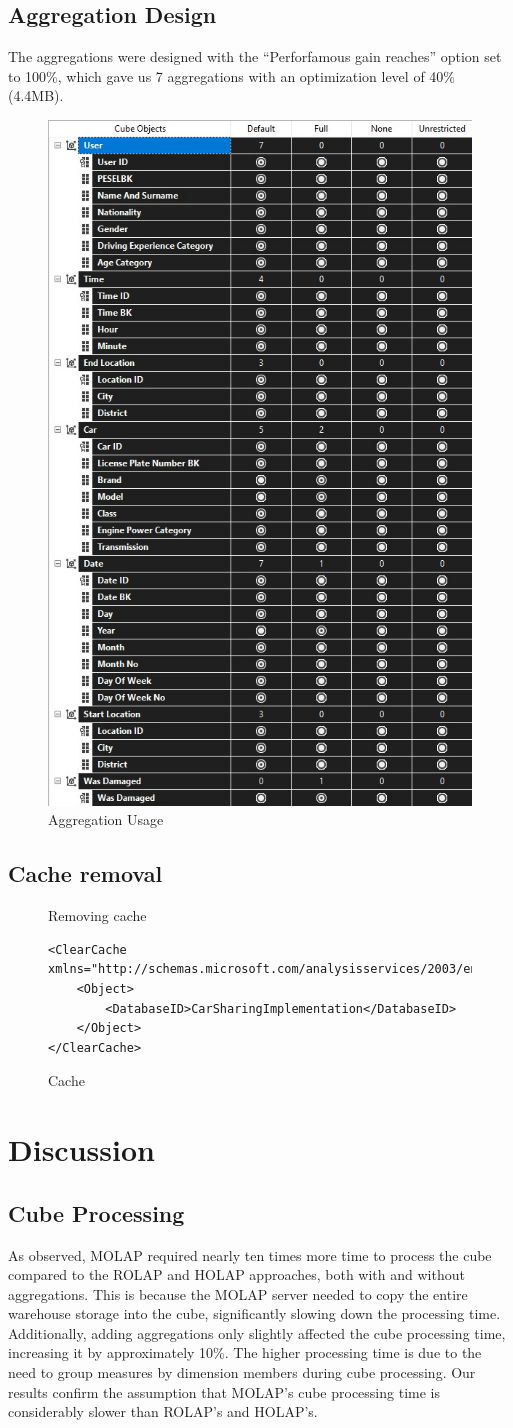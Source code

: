 \documentclass[a4paper,12pt]{article} %
\begin{document}
\subsection{Aggregation Design}
The aggregations were designed with the “Perforfamous gain reaches” option set to 100\%, which gave us 7 aggregations with an optimization level of 40\% (4.4MB).
\begin{figure}[H]
    \centering
    \includegraphics[width=0.5\linewidth]{aggregation_design.jpg}
    \caption{Aggregation Usage}
    \label{fig:aggregation-usage}
\end{figure}
\subsection{Cache removal}
\begin{figure}[H]
    \caption{Cache}
    \label{lst:cache}
Removing cache
\begin{verbatim}
<ClearCache xmlns="http://schemas.microsoft.com/analysisservices/2003/engine">
    <Object>
        <DatabaseID>CarSharingImplementation</DatabaseID>
    </Object>
</ClearCache>
\end{verbatim}
\end{figure}

\newpage
\section{Discussion}

\subsection{Cube Processing}
As observed, MOLAP required nearly ten times more time to process the cube compared to the ROLAP and HOLAP approaches, both with and without aggregations. This is because the MOLAP server needed to copy the entire warehouse storage into the cube, significantly slowing down the processing time. Additionally, adding aggregations only slightly affected the cube processing time, increasing it by approximately 10\%. The higher processing time is due to the need to group measures by dimension members during cube processing. Our results confirm the assumption that MOLAP's cube processing time is considerably slower than ROLAP's and HOLAP's.
\end{document}

